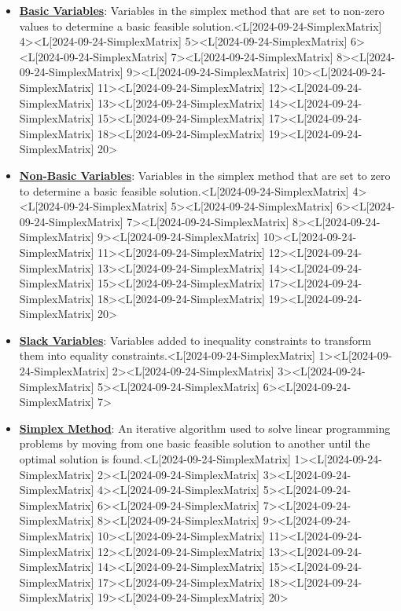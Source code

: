 \documentclass{article}%
\begin{document}
\begin{itemize}[[leftmargin=*]]%
\item \href{https://www.math.purdue.edu/~yipn/421/2024-09-24-SimplexMatrix.pdf#page=4}{\textbf{Basic Variables}}: Variables in the simplex method that are set to non-zero values to determine a basic feasible solution.<L[2024-09-24-SimplexMatrix] 4><L[2024-09-24-SimplexMatrix] 5><L[2024-09-24-SimplexMatrix] 6><L[2024-09-24-SimplexMatrix] 7><L[2024-09-24-SimplexMatrix] 8><L[2024-09-24-SimplexMatrix] 9><L[2024-09-24-SimplexMatrix] 10><L[2024-09-24-SimplexMatrix] 11><L[2024-09-24-SimplexMatrix] 12><L[2024-09-24-SimplexMatrix] 13><L[2024-09-24-SimplexMatrix] 14><L[2024-09-24-SimplexMatrix] 15><L[2024-09-24-SimplexMatrix] 17><L[2024-09-24-SimplexMatrix] 18><L[2024-09-24-SimplexMatrix] 19><L[2024-09-24-SimplexMatrix] 20>%
\item \href{https://www.math.purdue.edu/~yipn/421/2024-09-24-SimplexMatrix.pdf#page=4}{\textbf{Non{-}Basic Variables}}: Variables in the simplex method that are set to zero to determine a basic feasible solution.<L[2024-09-24-SimplexMatrix] 4><L[2024-09-24-SimplexMatrix] 5><L[2024-09-24-SimplexMatrix] 6><L[2024-09-24-SimplexMatrix] 7><L[2024-09-24-SimplexMatrix] 8><L[2024-09-24-SimplexMatrix] 9><L[2024-09-24-SimplexMatrix] 10><L[2024-09-24-SimplexMatrix] 11><L[2024-09-24-SimplexMatrix] 12><L[2024-09-24-SimplexMatrix] 13><L[2024-09-24-SimplexMatrix] 14><L[2024-09-24-SimplexMatrix] 15><L[2024-09-24-SimplexMatrix] 17><L[2024-09-24-SimplexMatrix] 18><L[2024-09-24-SimplexMatrix] 19><L[2024-09-24-SimplexMatrix] 20>%
\item \href{https://www.math.purdue.edu/~yipn/421/2024-09-24-SimplexMatrix.pdf#page=1}{\textbf{Slack Variables}}: Variables added to inequality constraints to transform them into equality constraints.<L[2024-09-24-SimplexMatrix] 1><L[2024-09-24-SimplexMatrix] 2><L[2024-09-24-SimplexMatrix] 3><L[2024-09-24-SimplexMatrix] 5><L[2024-09-24-SimplexMatrix] 6><L[2024-09-24-SimplexMatrix] 7>%
\item \href{https://www.math.purdue.edu/~yipn/421/2024-09-24-SimplexMatrix.pdf#page=1}{\textbf{Simplex Method}}: An iterative algorithm used to solve linear programming problems by moving from one basic feasible solution to another until the optimal solution is found.<L[2024-09-24-SimplexMatrix] 1><L[2024-09-24-SimplexMatrix] 2><L[2024-09-24-SimplexMatrix] 3><L[2024-09-24-SimplexMatrix] 4><L[2024-09-24-SimplexMatrix] 5><L[2024-09-24-SimplexMatrix] 6><L[2024-09-24-SimplexMatrix] 7><L[2024-09-24-SimplexMatrix] 8><L[2024-09-24-SimplexMatrix] 9><L[2024-09-24-SimplexMatrix] 10><L[2024-09-24-SimplexMatrix] 11><L[2024-09-24-SimplexMatrix] 12><L[2024-09-24-SimplexMatrix] 13><L[2024-09-24-SimplexMatrix] 14><L[2024-09-24-SimplexMatrix] 15><L[2024-09-24-SimplexMatrix] 17><L[2024-09-24-SimplexMatrix] 18><L[2024-09-24-SimplexMatrix] 19><L[2024-09-24-SimplexMatrix] 20>%

\end{itemize}
\end{document}
